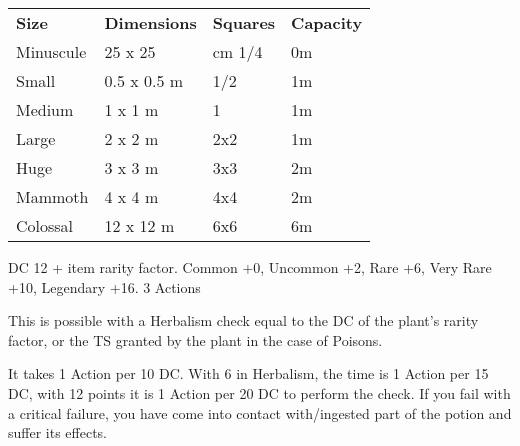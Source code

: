 \documentclass[landscape,10pt,a4paper]{article}
\begin{document}
\begin{multicols}{3}
\begin{dmbox}[title=Standard size and capacity - page \pageref{sizeandcarry}]
\begin{tabularx}{0.95\linewidth}{llll}
\toprule
\textbf{Size}& \textbf{Dimensions} &\textbf{Squares}&\textbf{Capacity}\\
Minuscule & 25 x 25 &cm 1/4&0m\\
Small & 0.5 x 0.5 m & 1/2&1m\\
Medium & 1 x 1 m & 1&1m\\
Large & 2 x 2 m& 2x2&1m\\
Huge & 3 x 3 m & 3x3&2m\\
Mammoth & 4 x 4 m&4x4&2m\\
Colossal & 12 x 12 m&6x6&6m
\end{tabularx}
\end{dmbox}






\begin{dmbox}[title=Evaluate - page \pageref{evaluate}]
DC 12 + item rarity factor. Common +0, Uncommon +2, Rare +6, Very Rare +10, Legendary +16. 3 Actions
\end{dmbox}

\begin{dmbox}[title=Identify a natural potion or poison - page \pageref{identificarepozioni}]
This is possible with a Herbalism check equal to the DC of the plant's rarity factor, or the TS granted by the plant in the case of Poisons.

It takes 1 Action per 10 DC. With 6 in Herbalism, the time is 1 Action per 15 DC, with 12 points it is 1 Action per 20 DC to perform the check. If you fail with a critical failure, you have come into contact with/ingested part of the potion and suffer its effects.
\end{dmbox}




\end{multicols}
\end{document}
